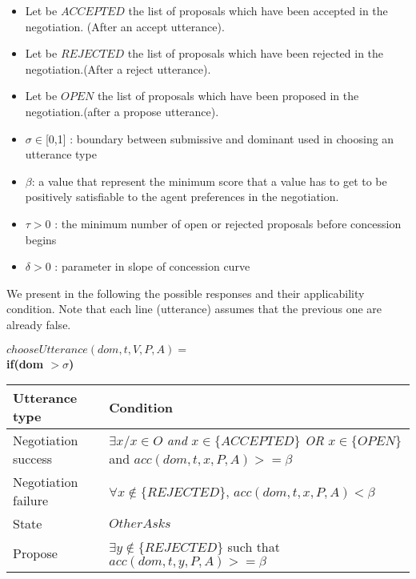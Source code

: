 \documentclass{article}
\begin{document}
	\begin{itemize}
		\item Let be $ACCEPTED$ the list of proposals which have been accepted in the negotiation. (After an accept utterance).
		\item Let be $REJECTED$ the list of proposals which have been rejected in the negotiation.(After a reject utterance).
		\item Let be $OPEN$ the list of proposals which have been proposed in the negotiation.(after a propose utterance).
		\item $\sigma \in $[0,1] : boundary between submissive and dominant used in
		choosing an utterance type
		\item $\beta$:  a value that represent the minimum score that a value has to get to be positively satisfiable to the agent preferences in the negotiation.
		\item $\tau > 0$ : the minimum number of open or rejected proposals before
		concession begins
		\item $\delta > 0$ : parameter in slope of concession curve
	\end{itemize}
	
	We present in the following the possible responses and their applicability condition. Note that each line (utterance)  assumes that the previous one are already false.
	
	$ chooseUtterance(dom, t, V, P, A) = $ \\
	\textbf{if(\textbf{dom  $>\sigma$})} \\
	\begin{tabular}{|p{3cm}|p{9cm}|}
		\hline
		\textbf{Utterance type} & Condition \\
		\hline
		 Negotiation success &  $\exists x/ x \in O$  \emph{and} $x \in \{ACCEPTED\}$  \newline \emph{OR} \newline $x \in \{OPEN\}$ and \newline $acc(dom,t,x,P,A) >= \beta$ \\
		\hline
		Negotiation failure & $ \forall x \notin \{REJECTED\}$, \newline  $acc(dom,t,x,P,A) < \beta $ \\
		\hline
		State & $OtherAsks$ \\
		\hline
		Propose & $\exists y \notin \{REJECTED\}$ such that \newline $acc(dom,t,y,P,A) >= \beta $  \\
		
	\hline
	\end{tabular}
	\\ \\
		
\end{document}
